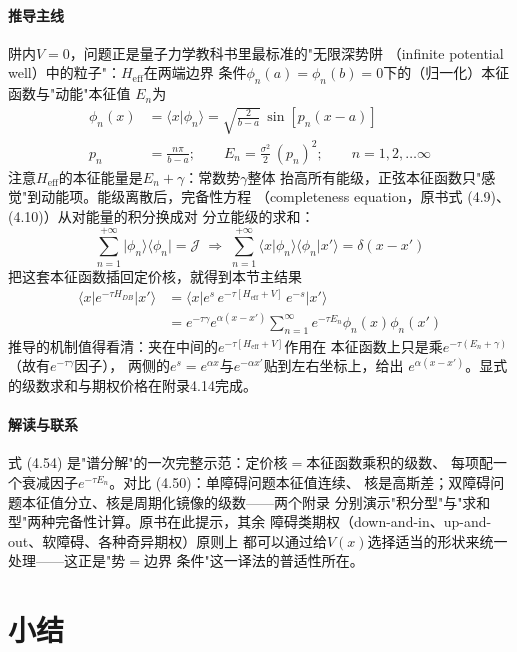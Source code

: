\paragraph{推导主线}
阱内$V=0$，问题正是量子力学教科书里最标准的"无限深势阱
（infinite potential well）中的粒子"：$H_{\mathrm{eff}}$在两端边界
条件$\phi_n(a)=\phi_n(b)=0$下的（归一化）本征函数与"动能"本征值
$E_n$为
\begin{align*}
\phi_n(x)&=\langle x\vert\phi_n\rangle=\sqrt{\frac{2}{b-a}}\,
\sin[p_n(x-a)]\\
p_n&=\frac{n\pi}{b-a};\qquad
E_n=\frac{\sigma^{2}}{2}\,(p_n)^{2};\qquad
n=1,2,\ldots\infty
\end{align*}
注意$H_{\mathrm{eff}}$的本征能量是$E_n+\gamma$：常数势$\gamma$整体
抬高所有能级，正弦本征函数只"感觉"到动能项。能级离散后，完备性方程
（completeness equation，原书式 (4.9)、(4.10)）从对能量的积分换成对
分立能级的求和：
\begin{equation*}
\sum_{n=1}^{+\infty}\vert\phi_n\rangle\langle\phi_n\vert=\mathcal{J}
\;\Rightarrow\;
\sum_{n=1}^{+\infty}\langle x\vert\phi_n\rangle\langle\phi_n\vert x'\rangle
=\delta(x-x')
\end{equation*}
把这套本征函数插回定价核，就得到本节主结果
\begin{align*}
\langle x\vert e^{-\tau H_{DB}}\vert x'\rangle
&=\langle x\vert e^{s}\,e^{-\tau[H_{\mathrm{eff}}+V]}\,e^{-s}\vert x'\rangle\\
&=e^{-\tau\gamma}e^{\alpha(x-x')}\sum_{n=1}^{\infty}e^{-\tau E_n}
\phi_n(x)\phi_n(x')
\tag{4.54}
\end{align*}
推导的机制值得看清：夹在中间的$e^{-\tau[H_{\mathrm{eff}}+V]}$作用在
本征函数上只是乘$e^{-\tau(E_n+\gamma)}$（故有$e^{-\tau\gamma}$因子），
两侧的$e^{s}=e^{\alpha x}$与$e^{-\alpha x'}$贴到左右坐标上，给出
$e^{\alpha(x-x')}$。显式的级数求和与期权价格在附录4.14完成。

\paragraph{解读与联系}
式 (4.54) 是"谱分解"的一次完整示范：定价核$=$本征函数乘积的级数、
每项配一个衰减因子$e^{-\tau E_n}$。对比 (4.50)：单障碍问题本征值连续、
核是高斯差；双障碍问题本征值分立、核是周期化镜像的级数——两个附录
分别演示"积分型"与"求和型"两种完备性计算。原书在此提示，其余
障碍类期权（down-and-in、up-and-out、软障碍、各种奇异期权）原则上
都可以通过给$V(x)$选择适当的形状来统一处理——这正是"势$=$边界
条件"这一译法的普适性所在。

\section{小结}

